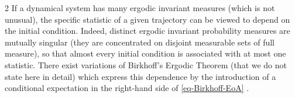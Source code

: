\documentclass[11pt]{article}
\begin{document}
\begin{multicols}{2}
If a dynamical system has many ergodic invariant measures (which is not unusual), the specific statistic of a given trajectory can be viewed to depend on the initial condition. 
Indeed, distinct ergodic invariant probability measures are mutually singular (they are concentrated on disjoint measurable sets of full measure), so that almost every initial condition is associated with at most one statistic. There exist variations of Birkhoff's Ergodic Theorem (that we do not state here in detail) which express this dependence by the introduction of a conditional expectation in the right-hand side of \eqref{eq-Birkhoff-EoA} \cite{walters2000introduction}.



\end{multicols}
\end{document}
